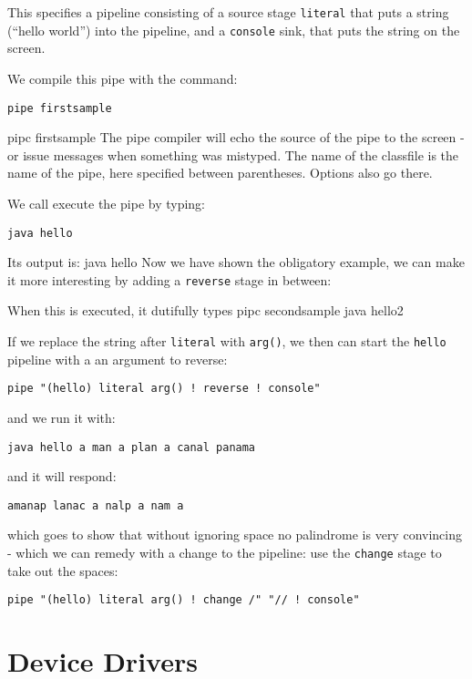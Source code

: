 This specifies a pipeline consisting of a source stage
\texttt{literal} that puts a string (``hello world'') into the pipeline, and
a \texttt{console} sink, that puts the string on the screen. 

We compile this pipe with the command:
\begin{verbatim}
pipe firstsample
\end{verbatim} 
\bash[stdout]
pipc firstsample
\END
The pipe
compiler will echo the source of the pipe to the screen - or issue
messages when something was mistyped. The name of the classfile is the
name of the pipe, here specified between parentheses. Options also go there.

We call execute the pipe by typing:
\begin{verbatim}
java hello
\end{verbatim}
Its output is:
\bash[stdout]
java hello
\END
Now we
have shown the obligatory example, we can make it more interesting by
adding a \texttt{reverse} stage in between:
 
When this is executed, it dutifully types 
\bash[stdout]
pipc secondsample
java hello2
\END

If we replace the string after \texttt{literal} with \texttt{arg()},
we then can start the \texttt{hello} pipeline with a an argument to
reverse:

\begin{lstlisting}[label=hellopipes3,caption=Hello World3]
pipe "(hello) literal arg() ! reverse ! console"
\end{lstlisting}
 and we run it with:
\begin{verbatim}
java hello a man a plan a canal panama
\end{verbatim}
and it will respond:
\begin{verbatim}
amanap lanac a nalp a nam a
\end{verbatim}
which goes to show that without ignoring space no palindrome is very
convincing - which we can remedy with a change to the pipeline: use the
\texttt{change} stage to take out the spaces:
\begin{lstlisting}[label=hellopipes4,caption=Hello World4]
pipe "(hello) literal arg() ! change /" "// ! console"
\end{lstlisting}

\chapter{Device Drivers}

